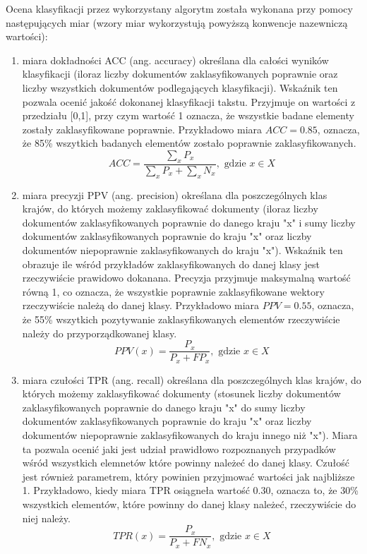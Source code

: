 \documentclass{classrep}
\begin{document}
Ocena klasyfikacji przez wykorzystany algorytm została wykonana przy pomocy następujących miar \cite{tablicapomylek} (wzory miar wykorzystują powyższą konwencje nazewniczą wartości):\\
\begin{enumerate}
\item miara dokładności ACC (ang. accuracy) określana dla całości wyników klasyfikacji (iloraz liczby dokumentów zaklasyfikowanych poprawnie oraz liczby wszystkich dokumentów podlegających klasyfikacji).
Wskaźnik ten pozwala ocenić jakość dokonanej klasyfikacji takstu. Przyjmuje on wartości z przedziału [0,1], przy czym wartość 1 oznacza, że wszystkie badane elementy zostały zaklasyfikowane poprawnie.
Przykładowo miara $ACC =  0.85$, oznacza, że 85\% wszytkich badanych elementów zostało poprawnie zaklasyfikowanych. 
  \begin{equation}
    ACC = \frac{\sum_{x} P_x }{\sum_{x} P_x+ \sum_{x}  N_x}, \text{ gdzie }x\in X
  \end{equation}


\item miara precyzji PPV (ang. precision) określana dla poszczególnych klas krajów, do których możemy zaklasyfikować dokumenty (iloraz liczby dokumentów zaklasyfikowanych poprawnie do danego kraju "x" i sumy liczby dokumentów zaklasyfikowanych poprawnie do kraju "x" oraz liczby dokumentów niepoprawnie zaklasyfikowanych do kraju "x").
Wskaźnik ten obrazuje ile wśród przykładów zaklasyfikowanych do danej klasy jest rzeczywiście prawidowo dokanana. Precyzja przyjmuje maksymalną wartość równą 1, co oznacza, że wszystkie poprawnie zaklasyfikowane wektory rzeczywiście należą do danej klasy. 
Przykładowo miara $PPV =  0.55$, oznacza, że 55\% wszytkich pozytywanie zaklasyfikowanych elementów rzeczywiście należy do przyporządkowanej klasy. 
  \begin{equation}
    PPV(x) = \frac{P_x}{ P_x + FP_x}, \text{ gdzie } x\in X
  \end{equation}


\item miara czułości TPR (ang. recall) określana dla poszczególnych klas krajów, do których możemy zaklasyfikować dokumenty (stosunek liczby dokumentów zaklasyfikowanych poprawnie do danego kraju "x" do sumy liczby dokumentów zaklasyfikowanych poprawnie do kraju "x" oraz liczby dokumentów niepoprawnie zaklasyfikowanych do kraju innego niż "x").
Miara ta pozwala ocenić jaki jest udział prawidłowo rozpoznanych przypadków wśród wszystkich elemnetów które powinny należeć do danej klasy. Czułość jest również parametrem, który powinien przyjmować wartości jak najbliższe 1.
Przykładowo, kiedy miara TPR osiągneła wartość 0.30, oznacza to, że 30\% wszystkich elementów, które powinny do danej klasy należeć, rzeczywiście do niej należy.
  \begin{equation}
    TPR(x) = \frac{P_x}{ P_x + FN_x} , \text{ gdzie } x\in X 
  \end{equation}



\end{enumerate}
\end{document}
